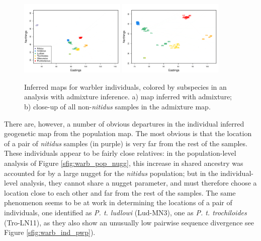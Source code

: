 \documentclass[12pt]{article}
\begin{document}
\begin{figure}
	\centering
			{\includegraphics[width=0.45\textwidth,height=0.37\textwidth]{figs/warblers/individual_warbler_map_arrows_randpr2.pdf}}
			{\includegraphics[width=0.45\textwidth,height=0.37\textwidth]{figs/warblers/individual_warbler_map_arrows_randpr2_closeup.pdf}}
	\caption{
    Inferred maps for warbler individuals, colored by subspecies in an analysis with admixture inference. 
    a) map inferred with admixture; b) close-up of all non-\textit{nitidus} samples in the admixture map.
}\label{sfig:warbler_ind_maps}
\end{figure}

There are, however, a number of obvious departures in the individual inferred geogenetic map from the population map.  The most obvious is that the location of a pair of \textit{nitidus} samples (in purple) is very far from the rest of the samples.  
These individuals appear to be fairly close relatives:
in the population-level analysis of Figure \ref{sfig:warb_pop_nugg},
this increase in shared ancestry was accounted for by a large nugget for the \textit{nitidus} population;
but in the individual-level analysis, they cannot share a nugget parameter, 
and must therefore choose a location close to each other and far from the rest of the samples.
The same phenomenon seems to be at work in determining the locations of a pair of individuals, one identified as \textit{P. t. ludlowi} (Lud-MN3), one as \textit{P. t. trochiloides} (Tro-LN11), 
as they also show an unusually low pairwise sequence divergence see Figure \ref{sfig:warb_ind_pwp}).
\end{document}
